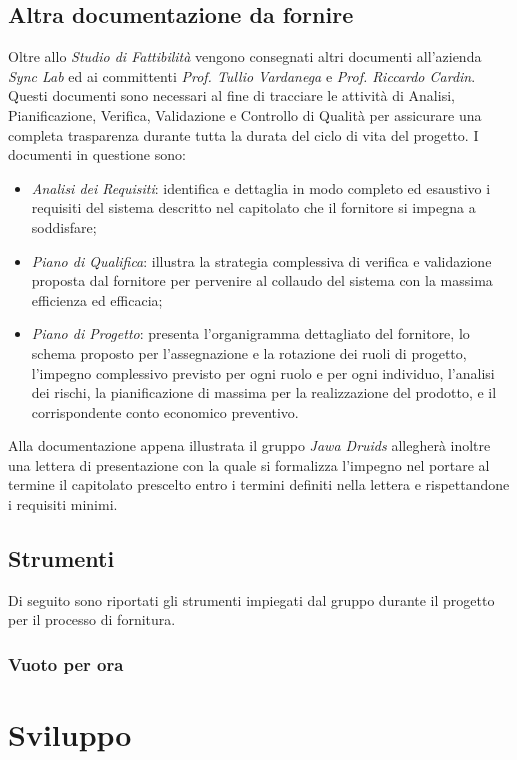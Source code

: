 \subsection{Altra documentazione da fornire}\label{2.1.3}
Oltre allo \textit{Studio di Fattibilità} vengono consegnati altri documenti all'azienda \textit{Sync Lab} ed ai committenti \textit{Prof. Tullio Vardanega} e \textit{Prof. Riccardo Cardin}. Questi documenti sono necessari al fine di tracciare le attività di Analisi, Pianificazione, Verifica, Validazione e Controllo di Qualità per assicurare una completa trasparenza durante tutta la durata del ciclo di vita del progetto.
I documenti in questione sono:
\begin{itemize}
	\item \textit{Analisi dei Requisiti}: identifica e dettaglia in modo completo ed esaustivo i requisiti del sistema descritto nel capitolato che il fornitore si impegna a soddisfare;
	\item \textit{Piano di Qualifica}: illustra la strategia complessiva di verifica e validazione proposta dal fornitore per pervenire al collaudo del sistema con la massima efficienza ed efficacia;
	\item \textit{Piano di Progetto}: presenta l'organigramma dettagliato del fornitore, lo schema proposto per l'assegnazione e la rotazione dei ruoli di progetto, l'impegno complessivo previsto per ogni ruolo e per ogni individuo, l'analisi dei rischi, la pianificazione di massima per la realizzazione del prodotto, e il corrispondente conto economico preventivo.
\end{itemize} 
Alla documentazione appena illustrata il gruppo \textit{Jawa Druids} allegherà inoltre una lettera di presentazione con la quale si formalizza l'impegno nel portare al termine il capitolato prescelto entro i termini definiti nella lettera e rispettandone i requisiti minimi.
\subsection{Strumenti}\label{2.1.4}
Di seguito sono riportati gli strumenti impiegati dal gruppo durante il progetto per il processo di fornitura.
\subsubsection{Vuoto per ora}\label{2.1.4.1}


\section{Sviluppo}\label{2.2}
